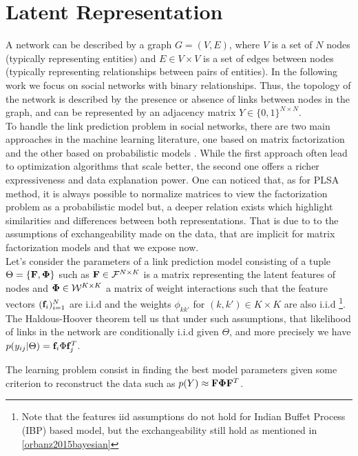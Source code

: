 \section{Latent Representation}
\label{sec:background}
A network can be described by a graph $G = (V,E)$, where $V$ is a set of $N$ nodes (typically representing entities) and $E \in V \times V$ is a set of edges between nodes (typically representing relationships between pairs of entities). In the following work we focus on social networks with binary relationships. Thus, the topology of the network is described by the presence or absence of links between nodes in the graph, and can be represented by an adjacency matrix $Y \in \{0,1\}^{N\times N}$.\\

To handle the link prediction problem in social networks, there are two main approaches in the machine learning literature, one based on matrix factorization \cite{menon2011link} and the other based on probabilistic models \cite{goldenberg2010survey}. While the first approach often lead to optimization algorithms that scale better, the second one offers a richer expressiveness and data explanation power.  One can noticed that, as for PLSA method, it is always possible to normalize matrices to view the factorization problem as a probabilistic model but, a deeper relation exists which highlight similarities and differences between both representations. That is due to to the assumptions of exchangeability made on the data, that are implicit for matrix factorization models and that we expose now.\\

Let's consider the parameters of a link prediction model consisting of a tuple $\Theta = \{ \mathbf{F} , \mathbf{\Phi}\}$ such as $\mathbf{F} \in \mathcal{F}^{N\times K}$ is a matrix representing the latent features of nodes and $\mathbf{\Phi} \in \mathcal{W}^{K\times K}$ a matrix of weight interactions such that the feature vectors $(\mathbf{f}_i)_{i=1}^N$ are i.i.d and the weights $\phi_{kk'}$ for $(k,k') \in K\times K$ are also i.i.d \footnote{Note that the features iid assumptions do not hold for Indian Buffet Process (IBP) based model, but the exchangeability still hold as mentioned in \ref{orbanz2015bayesian}}. The Haldous-Hoover theorem \cite{orbanz2015bayesian} tell us that under such assumptions, that likelihood of links in the network are conditionally i.i.d given $\Theta$, and more precisely we have $p(y_{ij}|\Theta) = \mathbf{f}_i \Phi \mathbf{f}_j^T$.

The learning problem consist in finding the best model parameters given some criterion to reconstruct the data such as $p(Y) \approx \mathbf{F}\mathbf{\Phi}\mathbf{F}^T$. 


